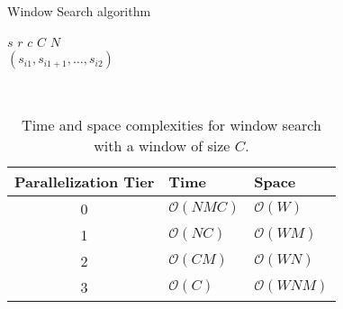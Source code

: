 \begin{algorithm}
\begin{algorithmic}[1]
\begin{spacing}{1.0}
    \caption{Window Search algorithm}
    \Require $s$ 
    \Require $r$ 
    \Require $c$ 
    \Require $C$ 
    \Require $N$ 
        \Else
    \EndIf\\
    \Return $(s_{i1},s_{i1+1},\dots,s_{i2})$
    \EndFunction

                \EndIf
            \EndIf
        \EndFor
    \EndFor\\
\label{alg:window_search}
\end{spacing}
\end{algorithmic}
\end{algorithm}

\begin{table}
\centering
\begin{tabular}{ |c|l|l| } 
 \hline
 Parallelization Tier & Time & Space \\ \hline
 0&$\mathcal{O}(NMC)$ & $\mathcal{O}(W)$ \\
 1&$\mathcal{O}(NC)$ & $\mathcal{O}(WM)$ \\
 2&$\mathcal{O}(CM)$ & $\mathcal{O}(WN)$ \\
 3&$\mathcal{O}(C)$ & $\mathcal{O}(WNM)$ \\ \hline
\end{tabular}
\caption{Time and space complexities for window search with a window of size $C$.}
\label{tab:waw_complexity}
\end{table}
